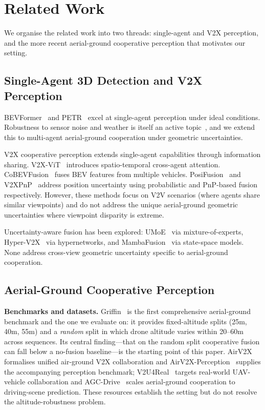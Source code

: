\documentclass[9.5pt,twocolumn,a4paper]{IEEEtran}
\begin{document}
\section{Related Work}
\label{sec:related}

We organise the related work into two threads: single-agent and V2X perception, and the more recent aerial-ground cooperative perception that motivates our setting.

\subsection{Single-Agent 3D Detection and V2X Perception}

BEVFormer~\cite{bevformer} and PETR~\cite{petr} excel at single-agent perception under ideal conditions. Robustness to sensor noise and weather is itself an active topic~\cite{robust_benchmark}, and we extend this to multi-agent aerial-ground cooperation under geometric uncertainties.

V2X cooperative perception extends single-agent capabilities through information sharing. V2X-ViT~\cite{v2xvit} introduces spatio-temporal cross-agent attention. CoBEVFusion~\cite{cobevfusion} fuses BEV features from multiple vehicles. PosiFusion~\cite{posifusion} and V2XPnP~\cite{v2xpnp} address position uncertainty using probabilistic and PnP-based fusion respectively. However, these methods focus on V2V scenarios (where agents share similar viewpoints) and do not address the unique aerial-ground geometric uncertainties where viewpoint disparity is extreme.

Uncertainty-aware fusion has been explored: UMoE~\cite{umoe} via mixture-of-experts, Hyper-V2X~\cite{hyperv2x} via hypernetworks, and MambaFusion~\cite{mambafusion} via state-space models. None address cross-view geometric uncertainty specific to aerial-ground cooperation.

\subsection{Aerial-Ground Cooperative Perception}

\noindent\textbf{Benchmarks and datasets.} Griffin~\cite{griffin} is the first comprehensive aerial-ground benchmark and the one we evaluate on: it provides fixed-altitude splits (25m, 40m, 55m) and a \emph{random} split in which drone altitude varies within 20--60m across sequences. Its central finding---that on the random split cooperative fusion can fall below a no-fusion baseline---is the starting point of this paper. AirV2X~\cite{airv2x} formalises unified air-ground V2X collaboration and AirV2X-Perception~\cite{airv2x_perception} supplies the accompanying perception benchmark; V2U4Real~\cite{v2u4real} targets real-world UAV-vehicle collaboration and AGC-Drive~\cite{agcdrive} scales aerial-ground cooperation to driving-scene prediction. These resources establish the setting but do not resolve the altitude-robustness problem.
\end{document}
